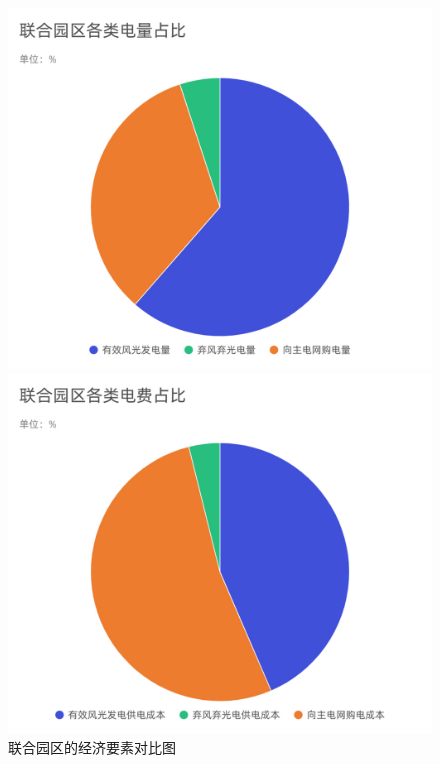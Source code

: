 \documentclass{cumcmthesis}
\begin{document}
  \begin{figure}[!h]  
\centering 
\begin{minipage}{.5\textwidth}  
  \centering  
  \includegraphics[width=.9\linewidth]{figures/2_1_饼图2.pdf}  
\end{minipage}%
\begin{minipage}{.5\textwidth}  
  \centering  
  \includegraphics[width=.9\linewidth]{figures/2_1_饼图.pdf}  
\end{minipage}  
\caption{联合园区的经济要素对比图}  
\end{figure} 
\end{document}
